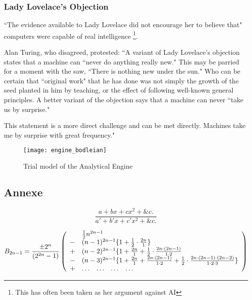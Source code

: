 \documentclass[a4paper, 12pt]{article}
\begin{document}
\subsubsection{Lady Lovelace's Objection}

``The evidence available to Lady Lovelace did not encourage her to believe that" computers were capable of real intelligence \footnote{This has often been taken as her argument against AI}. \cite{turing} 

Alan Turing, who disagreed, protested: ``A variant of Lady Lovelace's objection states that a machine can ``never do anything really new." This may be parried for a moment with the saw, ``There is nothing new under the sun." Who can be certain that ``original work" that he has done was not simply the growth of the seed planted in him by teaching, or the effect of following well-known general principles. A better variant of the objection says that a machine can never ``take us by surprise." 

This statement is a more direct challenge and can be met directly. Machines take me by surprise with great frequency." \cite{turing}

\begin{figure}[t]
\centering
\texttt{[image: engine\_bodleian]}
\caption{Trial model of the Analytical Engine}
\label{machine}
\end{figure}

\subsection{Annexe} \label{annexe}

\begin{equation}
\frac{a + bx + cx^2 + \&c.}{a' + b'x + c'x^2 + \&c.}
\end{equation}

\begin{equation}
B_{2n-1} = \frac{\pm2^n}{(2^{2n} - 1)} \left ( 
\begin{array}{ccccl}
& \multicolumn{4}{l}{\frac{1}{2}n^{2n-1}} \\
- & \multicolumn{4}{l}{(n - 1)^{2n-1} \{1 + \frac{1}{2} \cdot \frac{2n}{1}\}} \\
+ & \multicolumn{4}{l}{(n - 2)^{2n-1} \{1 + \frac{2n}{1} + \frac{1}{2} \cdot \frac{2n\cdot(2n-1)}{1\cdot2}} \\
- & \multicolumn{4}{l}{(n - 3)^{2n-1} \{1 + \frac{2n}{1} + \frac{2n\cdot(2n-1)}{1\cdot2} + \frac{1}{2} \cdot \frac{2n\cdot(2n-1)\cdot(2n-2)}{1\cdot2\cdot3}\}} \\
+ & \ldots & \ldots & \ldots & \ldots \\
\end{array} 
\right )
\end{equation}

\newpage


\end{document}
